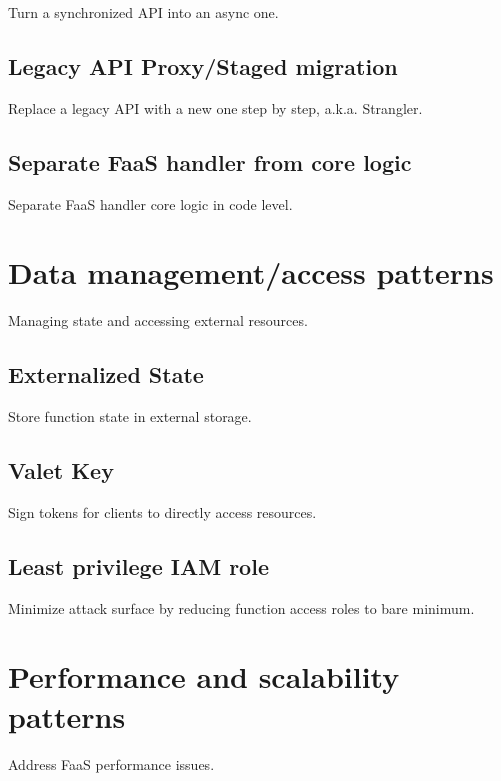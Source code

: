 Turn a synchronized API into an async one.

\subsection{Legacy API Proxy/Staged migration} \label{subsec:legacyApi}

Replace a legacy API with a new one step by step, a.k.a. Strangler.

\subsection{Separate FaaS handler from core logic} \label
{subsec:separateHandler}

Separate FaaS handler core logic in code level.

\section{Data management/access patterns} \label{sec:dataManagementPatterns}

Managing state and accessing external resources.

\subsection{Externalized State} \label{subsec:externalizedState}

Store function state in external storage.

\subsection{Valet Key} \label{subsec:valetKey}

Sign tokens for clients to directly access resources.

\subsection{Least privilege IAM role} \label{subsec:LeastprivilegeIAMrole}

Minimize attack surface by reducing function access roles to bare minimum.

\section{Performance and scalability patterns} \label{sec:perfPatterns}

Address FaaS performance issues.

